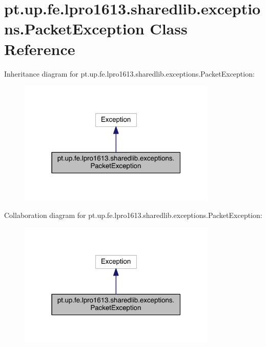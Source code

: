 \hypertarget{classpt_1_1up_1_1fe_1_1lpro1613_1_1sharedlib_1_1exceptions_1_1_packet_exception}{}\section{pt.\+up.\+fe.\+lpro1613.\+sharedlib.\+exceptions.\+Packet\+Exception Class Reference}
\label{classpt_1_1up_1_1fe_1_1lpro1613_1_1sharedlib_1_1exceptions_1_1_packet_exception}


Inheritance diagram for pt.\+up.\+fe.\+lpro1613.\+sharedlib.\+exceptions.\+Packet\+Exception\+:
\nopagebreak
\begin{figure}[H]
\begin{center}
\leavevmode
\includegraphics[width=268pt]{classpt_1_1up_1_1fe_1_1lpro1613_1_1sharedlib_1_1exceptions_1_1_packet_exception__inherit__graph}
\end{center}
\end{figure}


Collaboration diagram for pt.\+up.\+fe.\+lpro1613.\+sharedlib.\+exceptions.\+Packet\+Exception\+:
\nopagebreak
\begin{figure}[H]
\begin{center}
\leavevmode
\includegraphics[width=268pt]{classpt_1_1up_1_1fe_1_1lpro1613_1_1sharedlib_1_1exceptions_1_1_packet_exception__coll__graph}
\end{center}
\end{figure}
